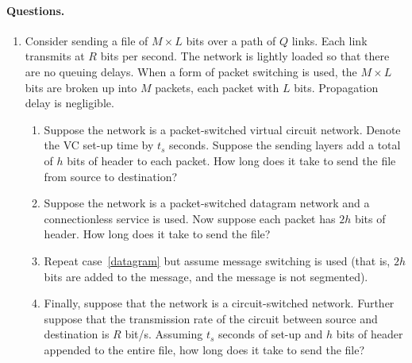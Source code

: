 \paragraph{Questions.}

\begin{enumerate}

  \item Consider sending a file of \(M \times L\) bits over a path of
    \(Q\) links. Each link transmits at \(R\) bits per second. The
    network is lightly loaded so that there are no queuing
    delays. When a form of packet switching is used, the \(M \times
    L\) bits are broken up into \(M\) packets, each packet with \(L\)
    bits. Propagation delay is negligible.
    \begin{enumerate}

      \item Suppose the network is a packet-switched virtual circuit
        network. Denote the VC set-up time by \(t_s\) seconds. Suppose
        the sending layers add a total of \(h\) bits of header to each
        packet. How long does it take to send the file from source to
        destination?

      \item \label{datagram} Suppose the network is a packet-switched
        datagram network and a connectionless service is used. Now
        suppose each packet has \(2h\) bits of header. How long does
        it take to send the file?

      \item Repeat case~\ref{datagram} but assume message switching is
        used (that is, \(2h\) bits are added to the message, and the
        message is not segmented).

      \item Finally, suppose that the network is a circuit-switched
        network. Further suppose that the transmission rate of the
        circuit between source and destination is \(R\)
        bit/s. Assuming \(t_s\) seconds of set-up and \(h\) bits of
        header appended to the entire file, how long does it take to
        send the file?

    \end{enumerate}

\end{enumerate}
